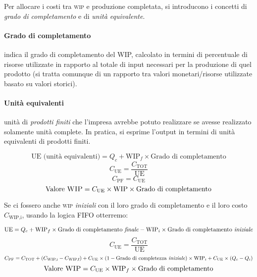 Per allocare i costi tra \textsc{wip} e produzione completata, si introducono i concetti
di \emph{grado di completamento} e di \emph{unità equivalente}.

\paragraph{Grado di completamento}
indica il grado di completamento del WIP, calcolato in termini di percentuale di
risorse utilizzate in rapporto al totale di input necessari per la produzione di
quel prodotto (si tratta comunque di un rapporto tra valori monetari/risorse
utilizzate basato su valori storici).

\paragraph{Unità equivalenti}
unità di \emph{prodotti finiti} che l’impresa
avrebbe potuto realizzare se avesse realizzato solamente unità complete. In
pratica, si esprime l’output in termini di unità equivalenti di prodotti finiti.

\begin{equation*}
    \text{UE (unità equivalenti)} = Q_c + \text{WIP}_f \times \text{Grado di completamento}
\end{equation*}
\begin{equation*}
    C_\text{UE} = \frac{C_\text{TOT}}{\text{UE}}
\end{equation*}
\begin{equation*}
    C_\text{PF} = C_\text{UE}
\end{equation*}
\begin{equation*}
    \text{Valore \textsc{WIP}} = C_\text{UE} \times \text{WIP} \times \text{Grado di completamento}
\end{equation*}

Se ci fossero anche \textsc{wip} \emph{iniziali} con il loro grado di completamento e il loro
costo $C_\text{WIP,i}$, usando la logica FIFO otterremo:

\begin{equation*}
    \text{UE} = Q_c + \text{WIP}_f \times \text{Grado di completamento \emph{finale}} -
    \text{WIP}_i \times \text{Grado di completamento \emph{iniziale}}
\end{equation*}
\begin{equation*}
    C_\text{UE} = \frac{C_\text{TOT}}{\text{UE}}
\end{equation*}
\begin{equation*}
    C_\text{PF} = C_\text{TOT} + (C_\text{WIP,i} - C_\text{WIP,f}) + C_\text{UE} \times
    (1 - \text{Grado di completezza \emph{iniziale}}) \times \text{WIP}_i + C_\text{UE} \times (Q_c - Q_i)
\end{equation*}
\begin{equation*}
    \text{Valore \textsc{WIP}} = C_\text{UE} \times \text{WIP}_f \times \text{Grado di completamento}
\end{equation*}

